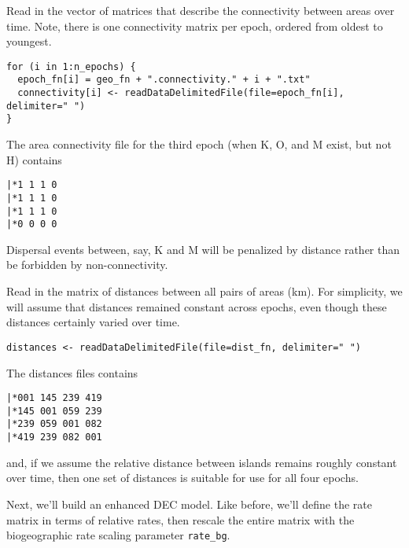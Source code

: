 Read in the vector of matrices that describe the connectivity between areas over time.
Note, there is one connectivity matrix per epoch, ordered from oldest to youngest.

\begin{snugshade}
\begin{lstlisting}
for (i in 1:n_epochs) {
  epoch_fn[i] = geo_fn + ".connectivity." + i + ".txt"
  connectivity[i] <- readDataDelimitedFile(file=epoch_fn[i], delimiter=" ")
}
\end{lstlisting}
\end{snugshade}

The area connectivity file for the third epoch (when K, O, and M exist, but not H) contains

\begin{snugshade}
\begin{lstlisting}
|*1 1 1 0
|*1 1 1 0
|*1 1 1 0
|*0 0 0 0
\end{lstlisting}
\end{snugshade}

Dispersal events between, say, K and M will be penalized by distance rather than be forbidden by non-connectivity.


Read in the matrix of distances between all pairs of areas (km).
For simplicity, we will assume that distances remained constant across epochs, even though these distances certainly varied over time.

\begin{snugshade}
\begin{lstlisting}
distances <- readDataDelimitedFile(file=dist_fn, delimiter=" ")
\end{lstlisting}
\end{snugshade}

The distances files contains

\begin{snugshade}
\begin{lstlisting}
|*001 145 239 419
|*145 001 059 239
|*239 059 001 082
|*419 239 082 001
\end{lstlisting}
\end{snugshade}

and, if we assume the relative distance between islands remains roughly constant over time, then one set of distances is suitable for use for all four epochs.


Next, we'll build an enhanced DEC model. Like before, we'll define the rate matrix in terms of relative rates, then rescale the entire matrix with the biogeographic rate scaling parameter {\tt rate\_bg}.

